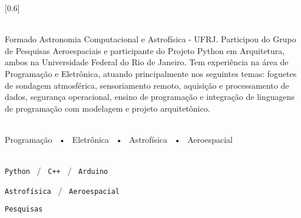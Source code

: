 \documentclass[darkhipster]{simplehipstercv}
\begin{document}
\setlength{\columnsep}{0.5cm}
[0.6]
\begin{paracol}{2}

\paracolbackgroundoptions



\footnotesize
{\setasidefontcolour
\flushleft
\begin{center}
\end{center}

\\[0.5em]

{\footnotesize
Formado Astronomia Computacional e Astrofísica - UFRJ. Participou do Grupo de Pesquisas Aeroespaciais e participante do Projeto Python em Arquitetura, ambos na Universidade Federal do Rio de Janeiro. Tem experiência na área de Programação e Eletrônica, atuando principalmente nos seguintes temas: foguetes de sondagem atmosférica, sensoriamento remoto, aquisição e processamento de dados, segurança operacional, ensino de programação e integração de linguagens de programação com modelagem e projeto arquitetônico.}
\bigskip

 \\[0.5em]

Programação ~•~ Eletrônica ~•~ Astrofísica ~•~ Aeroespacial

\bigskip


\\[0.5em]

\texttt{Python} ~/~ \texttt{C++} ~/~ \texttt{Arduino}

\texttt{Astrofísica} ~/~ \texttt{Aeroespacial}

\texttt{Pesquisas}

\vspace{4em}


\phantom{turn the page}

\phantom{turn the page}
}
\switchcolumn


\end{paracol}
\end{document}
